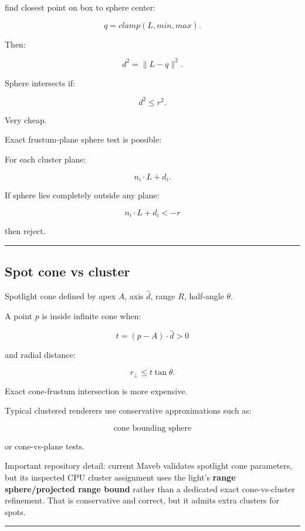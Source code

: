 find closest point on box to sphere center:

\[
q=
clamp(
L,
min,
max
).
\]

Then:

\[
d^2=
\|L-q\|^2.
\]

Sphere intersects if:

\[
\boxed{
d^2\le r^2.
}
\]

Very cheap.

Exact frustum-plane sphere test is possible:

For each cluster plane:

\[
n_i\cdot L+d_i.
\]

If sphere lies completely outside any plane:

\[
n_i\cdot L+d_i<-r
\]

then reject.

\begin{center}\rule{0.5\linewidth}{0.5pt}\end{center}

\subsection{Spot cone vs cluster}\label{04-visual-computing-ii-ch040-spot-cone-vs-cluster}

\hypertarget{04-visual-computing-ii-ch040-spot-cone-vs-cluster}{}

Spotlight cone defined by apex \(A\), axis \(\hat d\), range \(R\), half-angle \(\theta\).

A point \(p\) is inside infinite cone when:

\[
t=
(p-A)\cdot\hat d>0
\]

and radial distance:

\[
r_\perp
\le
t\tan\theta.
\]

Exact cone-frustum intersection is more expensive.

Typical clustered renderers use conservative approximations such as:

\[
\text{cone bounding sphere}
\]

or cone-vs-plane tests.

Important repository detail: current Maveb validates spotlight cone parameters, but its inspected CPU cluster assignment uses the light's \textbf{range sphere/projected range bound} rather than a dedicated exact cone-vs-cluster refinement. That is conservative and correct, but it admits extra clusters for spots.

\begin{center}\rule{0.5\linewidth}{0.5pt}\end{center}

